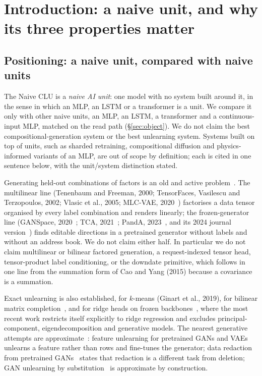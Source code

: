 \documentclass{article} %
\begin{document}
\section{Introduction: a naive unit, and why its three properties matter}
\label{sec:intro}

\subsection{Positioning: a naive unit, compared with naive units}
\label{sec:positioning}

The Naive CLU is a \emph{naive AI unit}: one model with no system built around it, in the sense
in which an MLP, an LSTM or a transformer is a unit. We compare it only with other naive units, an
MLP, an LSTM, a transformer and a continuous-input MLP, matched on the read path
(\S\ref{sec:object}). We do not claim the best compositional-generation system or the best
unlearning system. Systems built on top of units, such as sharded retraining, compositional
diffusion and physics-informed variants of an MLP, are out of scope by definition; each is cited
in one sentence below, with the unit/system distinction stated.

Generating held-out combinations of factors is an old and active problem~\citep{du2020compositional,liu2022compositional}. The multilinear
line (Tenenbaum and Freeman, 2000\nocite{tenenbaum2000separating}; TensorFaces, Vasilescu and Terzopoulos, 2002\nocite{vasilescu2002tensorfaces}; Vlasic et
al., 2005\nocite{vlasic2005face}; MLC-VAE, 2020~\citep{georgopoulos2020multilinear}) factorises a data tensor organised by every label combination and
renders linearly; the frozen-generator line (GANSpace, 2020~\citep{harkonen2020ganspace}; TCA, 2021~\citep{oldfield2021tensor}; PandA, 2023~\citep{oldfield2023panda}, and its
2024 journal version~\citep{oldfield2024bilinear}) finds editable directions in a pretrained generator without labels and
without an address book. We do not claim either half. In particular we do not claim
multilinear or bilinear factored generation, a request-indexed tensor head, tensor-product
label conditioning, or the downdate primitive, which follows in one line from the summation
form of Cao and Yang (2015)\nocite{cao2015towards} because a covariance is a summation.

Exact unlearning is also established, for $k$-means (Ginart et al., 2019\nocite{ginart2019making}), for bilinear
matrix completion~\citep{xu2023netflix}, and for ridge heads on frozen backbones~\citep{quan2026exact}, where the most recent work
restricts itself explicitly to ridge regression and excludes principal-component,
eigendecomposition and generative models. The nearest generative attempts are approximate~\citep{kong2022approximate}:
feature unlearning for pretrained GANs and VAEs~\citep{moon2024feature} unlearns a feature rather than rows and
fine-tunes the generator; data redaction from pretrained GANs~\citep{kong2023data} states that redaction is a
different task from deletion; GAN unlearning by substitution~\citep{sun2025generative} is approximate by construction.
\end{document}
